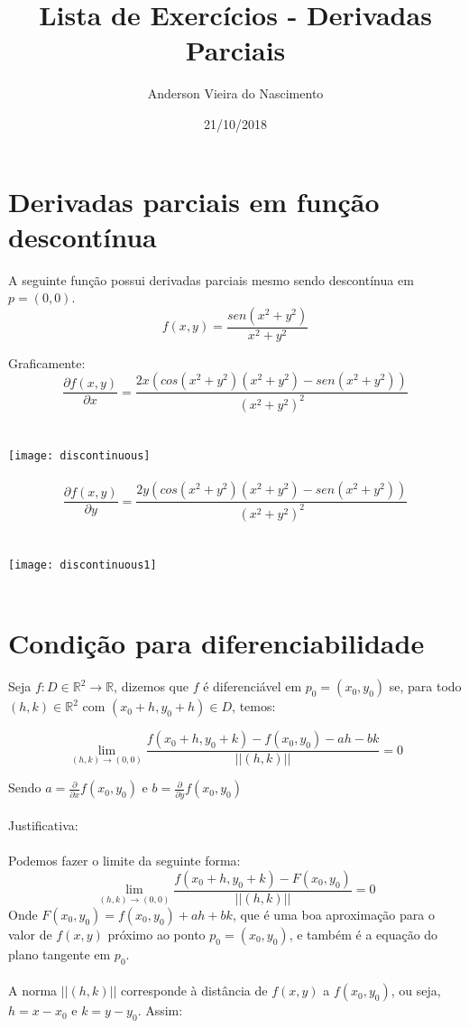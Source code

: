 \documentclass[11pt]{article}
\newcommand{\R}{\mathbb{R}}
\begin{document}
\title{Lista de Exercícios - Derivadas Parciais}
\author{Anderson Vieira do Nascimento}
\date{21/10/2018}
\maketitle

\section{Derivadas parciais em função descontínua}

A seguinte função possui derivadas parciais mesmo sendo descontínua em $p = (0, 0)$.\\

\begin{equation}
f(x, y) = \frac{sen(x^2 + y^2)}{x^2 + y^2}
\end{equation}

Graficamente:\\

$$\frac{\partial f(x, y)}{\partial x} = \frac{2x(cos(x^2 + y^2)(x^2 + y^2) - sen(x^2+y^2))}{(x^2 + y^2)^2}$$\\
\\
\texttt{[image: discontinuous]}\\
\\
$$\frac{\partial f(x, y)}{\partial y} = \frac{2y(cos(x^2 + y^2)(x^2 + y^2) - sen(x^2+y^2))}{(x^2 + y^2)^2}$$\\
\\
\texttt{[image: discontinuous1]}\\
\\
\section{Condição para diferenciabilidade}
Seja $f: D \in \R^2 \rightarrow \R$, dizemos que $f$ é diferenciável em $p_0 = (x_0, y_0)$ se, para todo $(h, k) \in \R^2$ com $(x_0+h, y_0+h) \in D$, temos:

\begin{equation}
\lim_{(h, k) \rightarrow (0, 0)} \frac{f(x_0+h, y_0+k) - f(x_0, y_0) - ah - bk}{||(h, k)||} = 0
\end{equation}

Sendo $a = \frac{\partial}{\partial x} f(x_0, y_0)$ e $b = \frac{\partial}{\partial y} f(x_0, y_0)$\\
\\

Justificativa:\\
\\Podemos fazer o limite da seguinte forma:
$$\lim_{(h, k) \rightarrow (0, 0)} \frac{f(x_0+h, y_0+k) - F(x_0, y_0)}{||(h, k)||} = 0$$
Onde $ F(x_0, y_0) = f(x_0, y_0) + ah + bk$, que é uma boa aproximação para o valor de $f(x, y)$ próximo ao ponto $p_0 = (x_0, y_0)$, e também é a equação do plano tangente em $p_0$.\\
\\
A norma $||(h, k)||$ corresponde à distância de $f(x, y)$ a $f(x_0, y_0)$, ou seja, $h = x - x_0$ e $k = y - y_0$. Assim:\\
\end{document}
